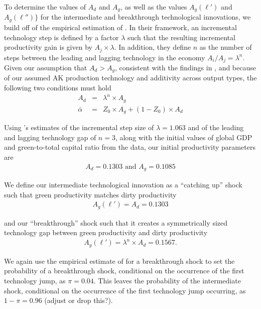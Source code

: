 \documentclass[12pt]{article}
\begin{document}
\begin{appendices}
To determine the values of $A_d$ and $A_g$, as well as the values $A_g(\ell')$ and $A_g(\ell'')\}$ for the intermediate and breakthrough technological innovations, we build off of the empirical estimation of \cite{Acemogluetal:2016}. In their framework, an incremental technology step is defined by a factor $\lambda$ such that the resulting incremental productivity gain is given by $A_j \times \lambda$. In addition, they define $n$ as the number of steps between the leading and lagging technology in the economy $A_i/A_j = \lambda^n$. Given our assumption that $A_d > A_g$, consistent with the findings in \cite{Acemogluetal:2016}, and because of our assumed AK production technology and additivity across output types, the following two conditions must hold
\begin{eqnarray*}
    A_d & = & \lambda^n \times A_g \\
    \bar{\alpha} & = & Z_0 \times A_g + (1- Z_0) \times A_d
\end{eqnarray*}


Using \cite{Acemogluetal:2016}'s estimates of the incremental step size of $\lambda = 1.063$ and of the leading and lagging technology gap of $n=3$, along with the initial values of global GDP and green-to-total capital ratio from the data, our initial productivity parameters are
\begin{eqnarray*}
    A_d = 0.1303 \text{ and } A_g = 0.1085
\end{eqnarray*}

We define our intermediate technological innovation as a ``catching up'' shock such that green productivity matches dirty productivity
\begin{eqnarray*}
    A_g(\ell') = A_d = 0.1303
\end{eqnarray*}

and our ``breakthrough'' shock such that it creates a symmetrically sized technology gap between green productivity and dirty productivity  
\begin{eqnarray*}
    A_g(\ell') = \lambda^n \times A_d = 0.1567.
\end{eqnarray*}

We again use the empirical estimate of \cite{Acemogluetal:2016} for a breakthrough shock to set the probability of a breakthrough shock, conditional on the occurrence of the first technology jump, as $\pi = 0.04$. This leaves the probability of the intermediate shock, conditional on the occurrence of the first technology jump occurring, as $1 - \pi = 0.96$ {\color{red}(adjust or drop this?)}.


\end{appendices}
\end{document}
